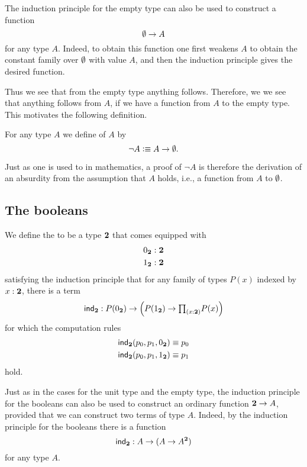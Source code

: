 The induction principle for the empty type can also be used to construct a function
\begin{equation*}
  \emptyset\to A
\end{equation*}
for any type $A$. Indeed, to obtain this function one first weakens $A$ to obtain the constant family over $\emptyset$ with value $A$, and then the induction principle gives the desired function.

Thus we see that from the empty type anything follows. Therefore, we we see that anything follows from $A$, if we have a function from $A$ to the empty type. This motivates the following definition.

\begin{defn}
  For any type $A$ we define  of $A$ by
  \begin{equation*}
    \neg A\vcentcolon\equiv A\to\emptyset.
  \end{equation*}
\end{defn}

Just as one is used to in mathematics, a proof of $\neg A$ is therefore the derivation of an absurdity from the assumption that $A$ holds, i.e., a function from $A$ to $\emptyset$.

\subsection{The booleans}
\begin{defn}
We define the  to be a type $\mathbf{2}$ that comes equipped with
\begin{align*}
{0_{\ensuremath{\mathbf{2}}}} & : \mathbf{2} \\
{1_{\mathbf{2}}} & : \mathbf{2}
\end{align*}
satisfying the induction principle that for any family of types $P(x)$ indexed by $x:\mathbf{2}$, there is a term
\begin{equation*}
\indbool : P(\bfalse)\to \Big(P(\btrue)\to \prd{x:\bool}P(x)\Big)
\end{equation*}
for which the computation rules
\begin{align*}
\mathsf{ind}_{\mathbf{2}}(p_0,p_1,{0_{\mathbf{2}}}) & \equiv p_0 \\
\mathsf{ind}_{\mathbf{2}}(p_0,p_1,{1_{\mathbf{2}}}) & \equiv p_1
\end{align*}
hold.
\end{defn}

Just as in the cases for the unit type and the empty type, the induction principle for the booleans can also be used to construct an ordinary function $\mathbf{2}\to A$, provided that we can construct two terms of type $A$. Indeed, by the induction principle for the booleans there is a function
\begin{equation*}
  \mathsf{ind}_{\mathbf{2}} : A \to (A\to A^\mathbf{2})
\end{equation*}
for any type $A$.

